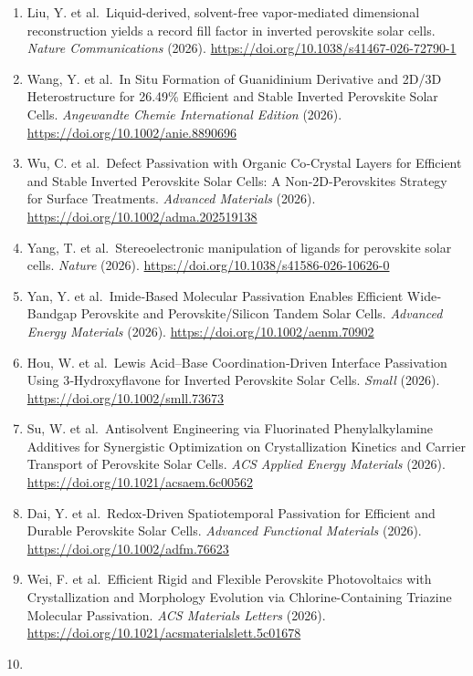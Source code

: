 \documentclass[
  11pt,
]{article}
\begin{document}
\begin{enumerate}
  \url{https://doi.org/10.1002/adfm.202532205}
\item
  Liu, Y. et al.~Liquid-derived, solvent-free vapor-mediated dimensional
  reconstruction yields a record fill factor in inverted perovskite
  solar cells. \emph{Nature Communications} (2026).
  \url{https://doi.org/10.1038/s41467-026-72790-1}
\item
  Wang, Y. et al.~In Situ Formation of Guanidinium Derivative and 2D/3D
  Heterostructure for 26.49\% Efficient and Stable Inverted Perovskite
  Solar Cells. \emph{Angewandte Chemie International Edition} (2026).
  \url{https://doi.org/10.1002/anie.8890696}
\item
  Wu, C. et al.~Defect Passivation with Organic Co‐Crystal Layers for
  Efficient and Stable Inverted Perovskite Solar Cells: A
  Non‐2D‐Perovskites Strategy for Surface Treatments. \emph{Advanced
  Materials} (2026). \url{https://doi.org/10.1002/adma.202519138}
\item
  Yang, T. et al.~Stereoelectronic manipulation of ligands for
  perovskite solar cells. \emph{Nature} (2026).
  \url{https://doi.org/10.1038/s41586-026-10626-0}
\item
  Yan, Y. et al.~Imide‐Based Molecular Passivation Enables Efficient
  Wide‐Bandgap Perovskite and Perovskite/Silicon Tandem Solar Cells.
  \emph{Advanced Energy Materials} (2026).
  \url{https://doi.org/10.1002/aenm.70902}
\item
  Hou, W. et al.~Lewis Acid--Base Coordination‐Driven Interface
  Passivation Using 3‐Hydroxyflavone for Inverted Perovskite Solar
  Cells. \emph{Small} (2026). \url{https://doi.org/10.1002/smll.73673}
\item
  Su, W. et al.~Antisolvent Engineering via Fluorinated Phenylalkylamine
  Additives for Synergistic Optimization on Crystallization Kinetics and
  Carrier Transport of Perovskite Solar Cells. \emph{ACS Applied Energy
  Materials} (2026). \url{https://doi.org/10.1021/acsaem.6c00562}
\item
  Dai, Y. et al.~Redox‐Driven Spatiotemporal Passivation for Efficient
  and Durable Perovskite Solar Cells. \emph{Advanced Functional
  Materials} (2026). \url{https://doi.org/10.1002/adfm.76623}
\item
  Wei, F. et al.~Efficient Rigid and Flexible Perovskite Photovoltaics
  with Crystallization and Morphology Evolution via Chlorine-Containing
  Triazine Molecular Passivation. \emph{ACS Materials Letters} (2026).
  \url{https://doi.org/10.1021/acsmaterialslett.5c01678}
\item

\end{enumerate}
\end{document}
